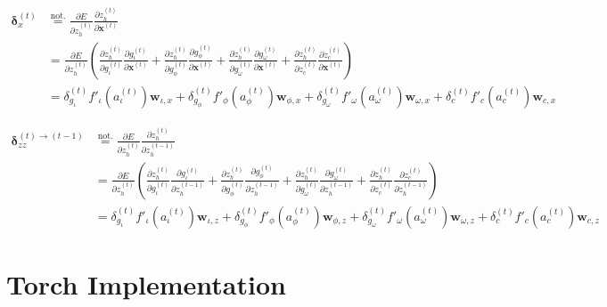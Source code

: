 \documentclass[11pt]{article}
\begin{document}
\begin{equation}
\begin{split}
    \boldsymbol{\delta}_x^{(t)} &\overset{\text{not.}}{=} \displaystyle\frac{\partial E}{\partial z_h^{(t)}}  \displaystyle\frac{\partial z_h^{(t)}}{\partial \mathbf{x}^{(t)}} \\
    &= \displaystyle\frac{\partial E}{\partial z_h^{(t)}} \left(
            \displaystyle\frac{\partial z_h^{(t)}}{\partial g_{\iota}^{(t)}} \displaystyle\frac{\partial g_{\iota}^{(t)}}{\partial \mathbf{x}^{(t)}} +
            \displaystyle\frac{\partial z_h^{(t)}}{\partial g_{\phi}^{(t)}} \displaystyle\frac{\partial g_{\phi}^{(t)}}{\partial \mathbf{x}^{(t)}} +
            \displaystyle\frac{\partial z_h^{(t)}}{\partial g_{\omega}^{(t)}} \displaystyle\frac{\partial g_{\omega}^{(t)}}{\partial \mathbf{x}^{(t)}} +
            \displaystyle\frac{\partial z_h^{(t)}}{\partial z_{c}^{(t)}} \displaystyle\frac{\partial z_{c}^{(t)}}{\partial \mathbf{x}^{(t)}} \right)\\
            &= \delta_{g_{\iota}}^{(t)} f'_{\iota}\left(a_{\iota}^{(t)}\right) \mathbf{w}_{\iota, x} +
               \delta_{g_{\phi}}^{(t)} f'_{\phi}\left(a_{\phi}^{(t)}\right) \mathbf{w}_{\phi, x} +
               \delta_{g_{\omega}}^{(t)} f'_{\omega}\left(a_{\omega}^{(t)}\right) \mathbf{w}_{\omega, x} +
               \delta_{c}^{(t)} f'_{c}\left(a_{c}^{(t)}\right) \mathbf{w}_{c, x}
\end{split}    
\end{equation}

\begin{equation}
\begin{split}
    \boldsymbol{\delta}_{zz}^{(t)\rightarrow(t-1)} &\overset{\text{not.}}{=} \displaystyle\frac{\partial E}{\partial z_h^{(t)}}  \displaystyle\frac{\partial z_h^{(t)}}{\partial z_h^{(t-1)}} \\
    &= \displaystyle\frac{\partial E}{\partial z_h^{(t)}} \left(
            \displaystyle\frac{\partial z_h^{(t)}}{\partial g_{\iota}^{(t)}} \displaystyle\frac{\partial g_{\iota}^{(t)}}{\partial z_h^{(t-1)}} +
            \displaystyle\frac{\partial z_h^{(t)}}{\partial g_{\phi}^{(t)}} \displaystyle\frac{\partial g_{\phi}^{(t)}}{\partial z_h^{(t-1)}} +
            \displaystyle\frac{\partial z_h^{(t)}}{\partial g_{\omega}^{(t)}} \displaystyle\frac{\partial g_{\omega}^{(t)}}{\partial z_h^{(t-1)}} +
            \displaystyle\frac{\partial z_h^{(t)}}{\partial z_{c}^{(t)}} \displaystyle\frac{\partial z_{c}^{(t)}}{\partial z_h^{(t-1)}} \right)\\
            &= \delta_{g_{\iota}}^{(t)} f'_{\iota}\left(a_{\iota}^{(t)}\right) \mathbf{w}_{\iota, z} +
               \delta_{g_{\phi}}^{(t)} f'_{\phi}\left(a_{\phi}^{(t)}\right) \mathbf{w}_{\phi, z} +
               \delta_{g_{\omega}}^{(t)} f'_{\omega}\left(a_{\omega}^{(t)}\right) \mathbf{w}_{\omega, z} +
               \delta_{c}^{(t)} f'_{c}\left(a_{c}^{(t)}\right) \mathbf{w}_{c, z}
\end{split}    
\end{equation}

\section{Torch Implementation}
\label{sec:torch}

\appendix

\printbibliography
\end{document}
